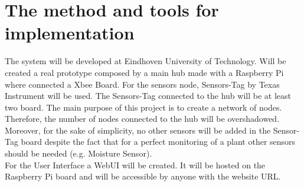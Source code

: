 \section{The method and tools for implementation}
The system will be developed at Eindhoven University of Technology. Will be created a real prototype composed by a main hub made with a Raspberry Pi where connected a Xbee Board. For the sensors node, Sensors-Tag by Texas Instrument will be used. The Sensors-Tag connected to the hub will be at least two board. The main purpose of this project is to create a network of nodes. Therefore, the number of nodes connected to the hub will be overshadowed. Moreover, for the sake of simplicity, no other sensors will be added in the Sensor-Tag board despite the fact that for a perfect monitoring of a plant other sensors should be needed (e.g. Moisture Sensor).\\
For the User Interface a WebUI will be created. It will be hosted on the Raspberry Pi board and will be accessible by anyone with the website URL.